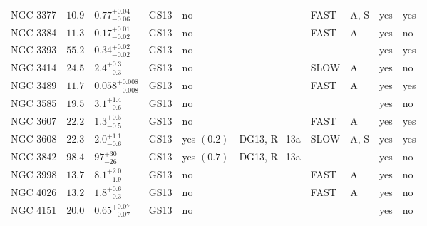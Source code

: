 \begin{table*}
\begin{center}
\begin{tabular}{llllllllll}
NGC 3377  &  $10.9$  &  $0.77_{-0.06}^{+0.04}$   &  GS13  &  no   &     &  FAST   &  A, S  &  yes  &  yes  \\ 
NGC 3384  &  $11.3$  &  $0.17_{-0.02}^{+0.01}$   &  GS13  &  no   &     &  FAST   &  A  &  yes  &  no  \\ 
NGC 3393  &  $55.2$  &  $0.34_{-0.02}^{+0.02}$   &  GS13  &  no   &     &      &     &  yes  &  yes  \\ 
NGC 3414  &  $24.5$  &  $2.4_{-0.3}^{+0.3}$   &  GS13  &  no   &     &   SLOW  &  A  &  yes  &  no  \\ 
NGC 3489  &  $11.7$  &  $0.058_{-0.008}^{+0.008}$   &  GS13  &  no   &     &  FAST   &  A  &  yes  &  yes  \\ 
NGC 3585  &  $19.5$  &  $3.1_{-0.6}^{+1.4}$   &  GS13  &  no   &     &      &     &  yes  &  no  \\ 
NGC 3607  &  $22.2$  &  $1.3_{-0.5}^{+0.5}$   &  GS13  &  no   &     &  FAST   &  A  &  yes  &  yes  \\ 
NGC 3608  &  $22.3$  &  $2.0_{-0.6}^{+1.1}$   &  GS13  &  yes  $(0.2)$  &  DG13, R+13a  &   SLOW  &  A, S  &  yes  &  yes  \\ 
NGC 3842  &  $98.4$  &  $97_{-26}^{+30}$   &  GS13  &  yes  $(0.7)$  &  DG13, R+13a  &      &     &  yes  &  no  \\ 
NGC 3998  &  $13.7$  &  $8.1_{-1.9}^{+2.0}$   &  GS13  &  no   &     &  FAST   &  A  &  yes  &  no  \\ 
NGC 4026  &  $13.2$  &  $1.8_{-0.3}^{+0.6}$   &  GS13  &  no   &     &  FAST   &  A  &  yes  &  no  \\ 
NGC 4151  &  $20.0$  &  $0.65_{-0.07}^{+0.07}$   &  GS13  &  no   &     &      &     &  yes  &  no  \\ 
\hline         
\end{tabular}   
\label{tab:sample} 
\end{center}    
\end{table*}    

